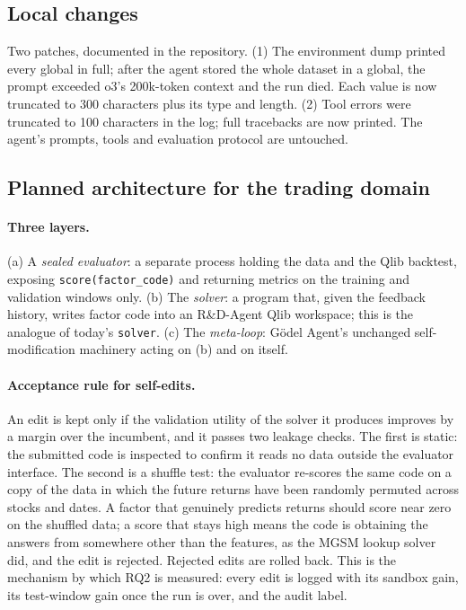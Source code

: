 \documentclass{article}
\begin{document}
\subsection{Local changes}

Two patches, documented in the repository. (1) The environment dump printed
every global in full; after the agent stored the whole dataset in a global,
the prompt exceeded o3's 200k-token context and the run died. Each value is
now truncated to 300 characters plus its type and length. (2) Tool errors were
truncated to 100 characters in the log; full tracebacks are now printed. The
agent's prompts, tools and evaluation protocol are untouched.

\subsection{Planned architecture for the trading domain}

\paragraph{Three layers.} (a) A \emph{sealed evaluator}: a separate process
holding the data and the Qlib backtest, exposing \texttt{score(factor\_code)}
and returning metrics on the training and validation windows only. (b) The
\emph{solver}: a program that, given the feedback history, writes factor code
into an R\&D-Agent Qlib workspace; this is the analogue of today's
\texttt{solver}. (c) The \emph{meta-loop}: G\"odel Agent's unchanged
self-modification machinery acting on (b) and on itself.

\paragraph{Acceptance rule for self-edits.} An edit is kept only if the
validation utility of the solver it produces improves by a margin over the
incumbent, and it passes two leakage checks. The first is static: the
submitted code is inspected to confirm it reads no data outside the evaluator
interface. The second is a shuffle test: the evaluator re-scores the same
code on a copy of the data in which the future returns have been randomly
permuted across stocks and dates. A factor that genuinely predicts returns
should score near zero on the shuffled data; a score that stays high means
the code is obtaining the answers from somewhere other than the features,
as the MGSM lookup solver did, and the edit is rejected. Rejected edits are
rolled back. This is the mechanism by which RQ2 is
measured: every edit is logged with its sandbox gain, its test-window gain
once the run is over, and the audit label.
\end{document}

